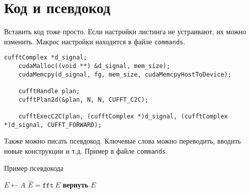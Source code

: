 
\section{Код и псевдокод}
Вставить код тоже просто. Если настройки листинга не устраивают, их можно изменить. Макрос настройки находится в файле \texttt{commands}.

\begin{lstlisting}[caption={Пример вызова БПФ в библиотеке \texttt{CuFFT}}]
    cufftComplex *d_signal;
    cudaMalloc((void **) &d_signal, mem_size);
    cudaMemcpy(d_signal, fg, mem_size, cudaMemcpyHostToDevice);

    cufftHandle plan;
    cufftPlan2d(&plan, N, N, CUFFT_C2C);

    cufftExecC2C(plan, (cufftComplex *)d_signal, (cufftComplex *)d_signal, CUFFT_FORWARD);
\end{lstlisting}

Также можно писать псевдокод. Ключевые слова можно переводить, вводить новые конструкции и т.д. Пример в файле \texttt{commands}.
\begin{algorithm}[H]
    \caption{Пример псевдокода}
    \begin{algorithmic}[1] %
        \State $E \gets A$
        \State $\hat{E} = \texttt{fft}~E$
        \EndFor
        \State \textbf{вернуть} $E$
        \EndProcedure
    \end{algorithmic}
\end{algorithm}
